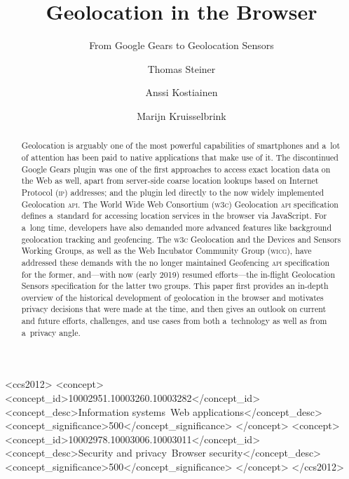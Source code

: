 \documentclass[sigconf,hyphens]{acmart}
\begin{document}
\title{Geolocation in the Browser}  

\subtitle{From Google Gears to Geolocation Sensors}

\author{Thomas Steiner}

\author{Anssi Kostiainen}

\author{Marijn Kruisselbrink}

\begin{abstract}
Geolocation is arguably one of the most powerful capabilities of smartphones
and a~lot of attention has been paid to native applications that make use of it.
The discontinued Google Gears plugin was one of the first approaches to access exact location data
on the Web as well, apart from server-side coarse location lookups
based on Internet Protocol (\textsc{ip}) addresses;
and the plugin led directly to the now widely implemented Geolocation \textsc{api}.
The World Wide Web Consortium (\textsc{w3c}) Geolocation \textsc{api} specification
defines a~standard for accessing location services in the browser via JavaScript.
For a~long time, developers have also demanded more advanced features
like background geolocation tracking and geofencing.
The \textsc{w3c} Geolocation and the Devices and Sensors Working Groups,
as well as the Web Incubator Community Group (\textsc{wicg}), have addressed these demands
with the no longer maintained Geofencing \textsc{api} specification for the former,
and---with now (early 2019) resumed efforts---the in-flight Geolocation Sensors specification
for the latter two groups.
This paper first provides an in-depth overview of the historical
development of geolocation in the browser
and motivates privacy decisions that were made at the time,
and then gives an outlook on current and future efforts, challenges, and use cases
from both a~technology as well as from a~privacy angle.
\end{abstract}

\begin{CCSXML}
<ccs2012>
<concept>
<concept_id>10002951.10003260.10003282</concept_id>
<concept_desc>Information systems~Web applications</concept_desc>
<concept_significance>500</concept_significance>
</concept>
<concept>
<concept_id>10002978.10003006.10003011</concept_id>
<concept_desc>Security and privacy~Browser security</concept_desc>
<concept_significance>500</concept_significance>
</concept>
</ccs2012>
\end{CCSXML}
\end{document}
